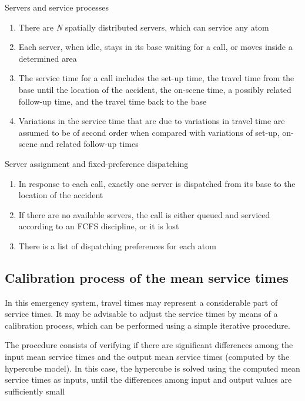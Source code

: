 \begin{frame}{Servers and service processes}
  \begin{enumerate}
  \item There are \textit{N} spatially distributed servers, 
    which can service any atom
  \item Each server, when idle, stays in its base waiting for a call, 
    or moves inside a determined area
  \item The service time for a call includes the set-up time, 
    the travel time from the base until the location of the accident, 
    the on-scene time, a possibly related follow-up time, 
    and the travel time back to the base
  \item Variations in the service time that are due to variations in travel time 
    are assumed to be of second order when compared with variations of set-up, 
    on-scene and related follow-up times
  \end{enumerate}
\end{frame}

\begin{frame}{Server assignment and fixed-preference dispatching}
  \begin{enumerate}
  \item In response to each call, 
    exactly one server is dispatched from its base to the location of the accident
  \item If there are no available servers, 
    the call is either queued and serviced according to an FCFS discipline,
    or it is lost
  \item There is a list of dispatching preferences for each atom
  \end{enumerate}
\end{frame}

\subsection{Calibration process of the mean service times}
\begin{frame}
In this emergency system, 
travel times may represent a considerable part of service times. 
It may be advisable to adjust the service times by means of a calibration process,
which can be performed using a simple iterative procedure.

The procedure consists of 
verifying if there are significant differences among 
the input mean service times and the output mean service times (computed by the hypercube model). 
In this case, 
the hypercube is solved using the computed mean service times as inputs, 
until the differences among input and output values are sufficiently small
\end{frame}
